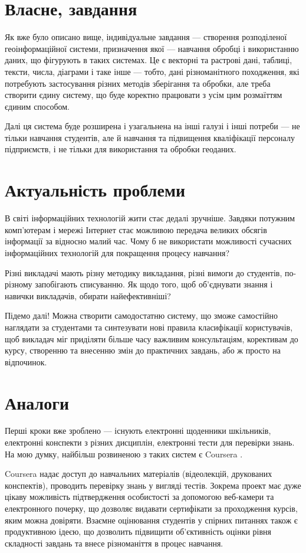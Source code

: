 \section{Власне, завдання}
Як вже було описано вище, індивідуальне завдання --- створення розподіленої
геоінформаційної системи, призначення якої --- навчання обробці і використанню
даних, що фігурують в таких системах.
Це є векторні та растрові дані, таблиці, тексти, числа, діаграми і таке інше
--- тобто, дані різноманітного походження, які потребують застосування різних
методів зберігання та обробки, але треба створити єдину систему, що буде
коректно працювати з усім цим розмаїттям єдиним способом.

Далі ця система буде розширена і узагальнена на інші галузі і інші потреби
--- не тільки навчання студентів, але й навчання та підвищення кваліфікації
персоналу підприємств, і не тільки для використання та обробки геоданих.

\section{Актуальність проблеми}
В світі інформаційних технологій жити стає дедалі зручніше.
Завдяки потужним комп’ютерам і мережі Інтернет стає можливою передача великих
обсягів інформації за відносно малий час.
Чому б не використати можливості сучасних інформаційних технологій для
покращення процесу навчання?

Різні викладачі мають різну методику викладання, різні вимоги до
студентів, по-різному запобігають списуванню.
Як щодо того, щоб об’єднувати знання і навички викладачів, обирати
найефективніші?

Підемо далі! Можна створити самодостатню систему, що зможе самостійно наглядати
за студентами та синтезувати нові правила класифікації користувачів, щоб
викладач міг приділяти більше часу важливим консультаціям, корективам до курсу,
створенню та внесенню змін до практичних завдань, або ж просто на відпочинок.

\section{Аналоги}
Перші кроки вже зроблено --- існують електронні щоденники шкільників,
електронні конспекти з різних дисциплін, електронні тести для перевірки знань.
На мою думку, найбільш розвиненою з таких систем є Coursera \cite{Coursera}.

Coursera надає доступ до навчальних матеріалів (відеолекцій, друкованих
конспектів), проводить перевірку знань у вигляді тестів.
Зокрема проект має дуже цікаву можливість підтвердження особистості за
допомогою веб-камери та електронного почерку, що дозволяє видавати сертифікати
за проходження курсів, яким можна довіряти.
Взаємне оцінювання студентів у спірних питаннях також є продуктивною ідеєю, що
дозволить підвищити об’єктивність оцінки рівня складності завдань та внесе
різноманіття в процес навчання.

